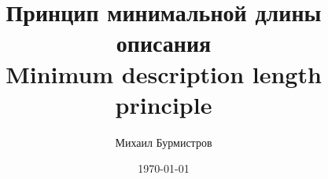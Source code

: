 \documentclass[unicode,lefteqn,c,hyperref={pdfpagelabels=true}]{beamer}
\title[\hbox to 56mm{MDL principle \hfill\insertframenumber\,/\,\inserttotalframenumber}]{Принцип минимальной длины описания \\ Minimum description length principle}
\author[Михаил Бурмистров]{Михаил Бурмистров}
\date{\today}
\begin{document}
\begin{frame}
    \maketitle
\end{frame}
\end{document}
